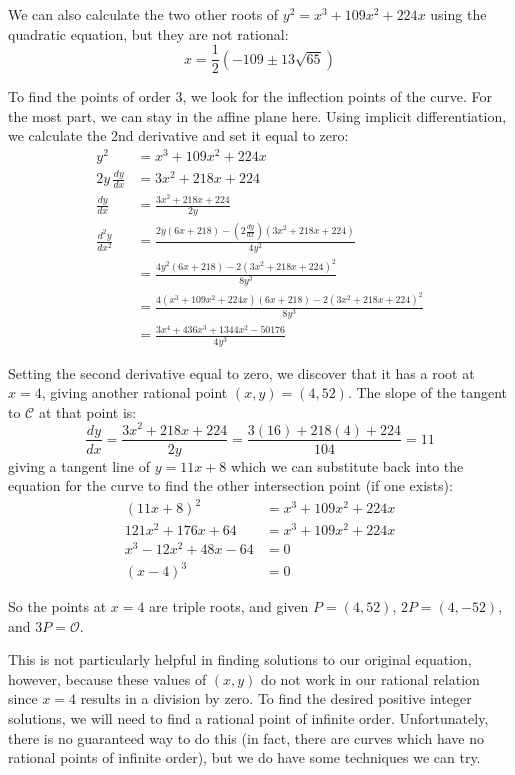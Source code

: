 \documentclass{article}
\begin{document}
We can also calculate the two other roots of $y^2=x^3+109x^2+224x$ using the quadratic equation, but
they are not rational:
\[ x = \frac{1}{2}(-109 \pm 13\sqrt{65}) \]

To find the points of order 3, we look for the inflection points of the curve. For the most part, we can stay
in the affine plane here. Using implicit differentiation, we calculate the 2nd derivative and set it equal to zero:
\begin{equation*}
	\begin{split}
		y^2 &= x^3 + 109x^2 + 224x \\
		2y\, \frac{dy}{dx} &= 3x^2 + 218x + 224 \\
		\frac{dy}{dx} &= \frac{3x^2+218x+224}{2y} \\
		\frac{d^2y}{dx^2} &= \frac{2y(6x+218) - (2\frac{dy}{dx})(3x^2+218x+224)}{4y^2} \\
		&= \frac{4y^2(6x+218) - 2(3x^2+218x+224)^2}{8y^3} \\
		&= \frac{4(x^3 + 109x^2 + 224x)(6x+218) - 2(3x^2+218x+224)^2}{8y^3} \\
		&= \frac{3x^4+436x^3+1344x^2-50176}{4y^3} 
	\end{split}
\end{equation*}

Setting the second derivative equal to zero, we discover that it has a root at $x=4$, giving another rational
point $(x,y) = (4,52)$. The slope of the tangent to $\mathcal{C}$ at that point is:
\[ \frac{dy}{dx} = \frac{3x^2+218x+224}{2y} = \frac{3(16) + 218(4) + 224}{104} = 11 \]
giving a tangent line of $y = 11x + 8$ which we can substitute back into the equation for the curve to
find the other intersection point (if one exists):
\begin{equation*}
	\begin{split} 
		(11x+8)^2 &= x^3+109x^2+224x \\
		121x^2+176x+64 &= x^3+109x^2+224x \\
		x^3-12x^2+48x-64 &= 0 \\
		(x-4)^3 &= 0
	\end{split}
\end{equation*}

So the points at $x=4$ are triple roots, and given $P=(4,52)$, $2P = (4,-52)$, and $3P = \mathcal{O}$.

This is not particularly helpful in finding solutions to our original equation, however, because these
values of $(x,y)$ do not work in our rational relation since $x=4$ results in a division by zero. To
find the desired positive integer solutions, we will need to find a rational point of infinite order.
Unfortunately, there is no guaranteed way to do this (in fact, there are curves which have no rational
points of infinite order), but we do have some techniques we can try.
\end{document}
